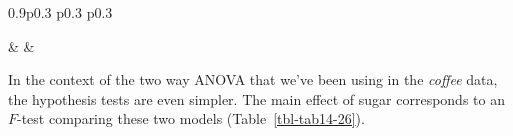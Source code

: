 \documentclass[
  a4paper,
]{book}
\begin{document}
\begin{table}[ht]
\begin{centerbox}
\begin{threeparttable}
\begin{tabularx}{0.9\textwidth}{p{} p{} p{}}
\hhline{}

 &
 &
 \tabularnewline[-0.5pt]


\end{tabularx} 

\end{threeparttable}\par\end{centerbox}

\end{table}
 

In the context of the two way ANOVA that we've been using in the
\emph{coffee} data, the hypothesis tests are even simpler. The main
effect of sugar corresponds to an \(F\)-test comparing these two models
(Table~\ref{tbl-tab14-26}).

\hypertarget{tbl-tab14-26}{}
 
  \providecommand{\huxb}[2]{\arrayrulecolor[RGB]{#1}\global\arrayrulewidth=#2pt}
  \providecommand{\huxvb}[2]{\color[RGB]{#1}\vrule width #2pt}
  \providecommand{\huxtpad}[1]{\rule{0pt}{#1}}
  \providecommand{\huxbpad}[1]{\rule[-#1]{0pt}{#1}}
\end{document}
